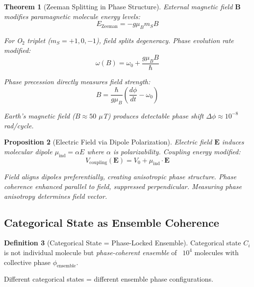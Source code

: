 \documentclass[11pt,a4paper]{article}
\newtheorem{theorem}{Theorem}[section]
\newtheorem{proposition}[theorem]{Proposition}
\theoremstyle{definition}
\newtheorem{definition}[theorem]{Definition}
\theoremstyle{remark}
\begin{document}
\begin{theorem}[Zeeman Splitting in Phase Structure]
External magnetic field $\mathbf{B}$ modifies paramagnetic molecule energy levels:
\begin{equation}
E_{\text{Zeeman}} = -g\mu_B m_S B
\end{equation}

For O$_2$ triplet ($m_S = +1, 0, -1$), field splits degeneracy. Phase evolution rate modified:
\begin{equation}
\omega(B) = \omega_0 + \frac{g\mu_B B}{\hbar}
\end{equation}

Phase precession directly measures field strength:
\begin{equation}
B = \frac{\hbar}{g\mu_B}\left(\frac{d\phi}{dt} - \omega_0\right)
\end{equation}

Earth's magnetic field ($B \approx 50$ $\mu$T) produces detectable phase shift $\Delta\phi \approx 10^{-8}$ rad/cycle.
\end{theorem}

\begin{proposition}[Electric Field via Dipole Polarization]
Electric field $\mathbf{E}$ induces molecular dipole $\mu_{\text{ind}} = \alpha E$ where $\alpha$ is polarizability. Coupling energy modified:
\begin{equation}
V_{\text{coupling}}(\mathbf{E}) = V_0 + \mu_{\text{ind}} \cdot \mathbf{E}
\end{equation}

Field aligns dipoles preferentially, creating anisotropic phase structure. Phase coherence enhanced parallel to field, suppressed perpendicular. Measuring phase anisotropy determines field vector.
\end{proposition}

\subsection{Categorical State as Ensemble Coherence}

\begin{definition}[Categorical State = Phase-Locked Ensemble]
Categorical state $C_i$ is not individual molecule but \textit{phase-coherent ensemble} of ~$10^4$ molecules with collective phase $\phi_{\text{ensemble}}$.

Different categorical states = different ensemble phase configurations.
\end{definition}
\end{document}
